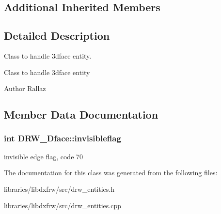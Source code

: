 \subsection*{Additional Inherited Members}


\subsection{Detailed Description}
Class to handle 3dface entity. 

Class to handle 3dface entity \begin{DoxyAuthor}{Author}
Rallaz 
\end{DoxyAuthor}


\subsection{Member Data Documentation}
\hypertarget{classDRW__3Dface_a0fbb465670025bbd116aef1804fa5b44}{
\subsubsection[{invisibleflag}]{\setlength{\rightskip}{0pt plus 5cm}int D\-R\-W\-\_\-Dface\-::invisibleflag}}\label{classDRW__3Dface_a0fbb465670025bbd116aef1804fa5b44}
invisible edge flag, code 70 

The documentation for this class was generated from the following files\-:\begin{DoxyCompactItemize}
\item 
libraries/libdxfrw/src/drw\-\_\-entities.\-h\item 
libraries/libdxfrw/src/drw\-\_\-entities.\-cpp\end{DoxyCompactItemize}
